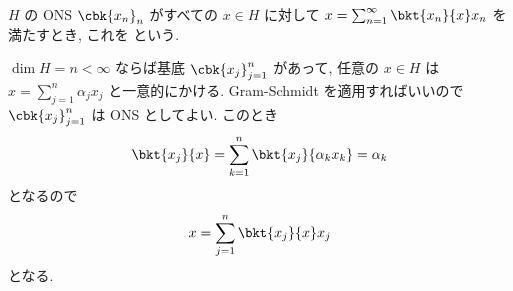 \documentclass[openany, a4paper, oneside]{jsbook}
\begin{document}
\begin{defn}
 $H$ の ONS $\cbk{x_{n}}_n$ がすべての $x \in H$ に対して $x = \sum_{n = 1}^\infty \bkt{{x_n}}{x} x_n$ を満たすとき,
 これを という.
\end{defn}
\begin{rem}
 $\dim H = n < \infty$ ならば基底 $\cbk{x_{j}}_{j=1}^n$ があって,
 任意の $x \in H$ は $x = \sum_{j = 1}^n \alpha_j x_j$ と一意的にかける.
 Gram-Schmidt を適用すればいいので $\cbk{x_{j}}_{j=1}^n$ は ONS としてよい.
 このとき
 \begin{align}
  \bkt{x_j}{x}
  =
  \sum_{k=1}^n \bkt{x_j}{\alpha_k x_k}
  =
  \alpha_k
 \end{align}
 となるので
 \begin{align}
  x
  =
  \sum_{j = 1}^n \bkt{x_j}{x} x_j
 \end{align}
 となる.
\end{rem}
\end{document}
